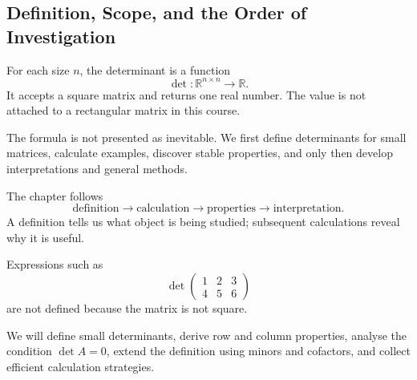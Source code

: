 \subsection{Definition, Scope, and the Order of Investigation}

\begin{corebox}
For each size $n$, the determinant is a function
\[
\det\colon \mathbb{R}^{n\times n}\longrightarrow \mathbb{R}.
\]
It accepts a square matrix and returns one real number. The value is not attached to a rectangular matrix in this course.
\end{corebox}

The formula is not presented as inevitable. We first define determinants for small matrices, calculate examples, discover stable properties, and only then develop interpretations and general methods.

\begin{interpretationbox}
The chapter follows
\[
\text{definition}\longrightarrow\text{calculation}\longrightarrow
\text{properties}\longrightarrow\text{interpretation}.
\]
A definition tells us what object is being studied; subsequent calculations reveal why it is useful.
\end{interpretationbox}

\begin{remarkbox}
Expressions such as
\[
\det\begin{pmatrix}1&2&3\\4&5&6\end{pmatrix}
\]
are not defined because the matrix is not square.
\end{remarkbox}

\begin{summarybox}
We will define small determinants, derive row and column properties, analyse the condition $\det A=0$, extend the definition using minors and cofactors, and collect efficient calculation strategies.
\end{summarybox}

